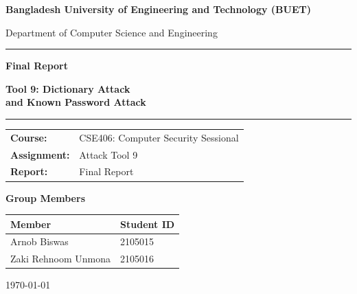 \documentclass[11pt]{article}
\begin{document}
\begin{titlepage}
\centering
\vspace*{1.2cm}
{\large\bfseries Bangladesh University of Engineering and Technology (BUET)\par}
\vspace{0.25cm}
{\large Department of Computer Science and Engineering\par}

\vspace{2.2cm}
{\color{steel}\rule{0.82\textwidth}{1.4pt}\par}
\vspace{0.7cm}
{\Huge\bfseries\color{navy} Final Report\par}
\vspace{0.5cm}
{\LARGE\bfseries Tool 9: Dictionary Attack\\[2pt] and Known Password Attack\par}
\vspace{0.7cm}
{\color{steel}\rule{0.82\textwidth}{1.4pt}\par}

\vspace{1.8cm}
{\large
\begin{tabular}{ll}
\textbf{Course:} & CSE406: Computer Security Sessional \\
\textbf{Assignment:} & Attack Tool 9 \\
\textbf{Report:} & Final Report \\
\end{tabular}
\par}

\vfill

{\large\bfseries\color{navy} Group Members\par}
\vspace{0.4cm}
\begin{tabular}{p{6cm}p{2.5cm}}
\toprule
\rowcolor{navy!12}
\textbf{Member} & \textbf{Student ID} \\
\midrule
Arnob Biswas & 2105015 \\[1.2ex]
Zaki Rehnoom Unmona & 2105016 \\
\bottomrule
\end{tabular}

\vspace{1.6cm}
{\large \today\par}
\vspace{1cm}
\end{titlepage}

\tableofcontents
\newpage
{}
\setcounter{page}{1}
\end{document}
